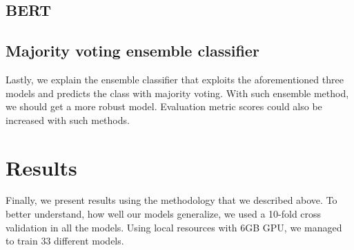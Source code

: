 \documentclass[conference]{IEEEtran}
\begin{document}
\subsection{BERT}


\subsection{Majority voting ensemble classifier}
Lastly, we explain the ensemble classifier that exploits the aforementioned three models and predicts the class with majority voting. With such ensemble method, we should get a more robust model. Evaluation metric scores could also be increased with such methods.

\section{Results}
Finally, we present results using the methodology that we described above. To better understand, how well our models generalize, we used a 10-fold cross validation in all the models. Using local resources with 6GB GPU, we managed to train 33 different models.
\end{document}
